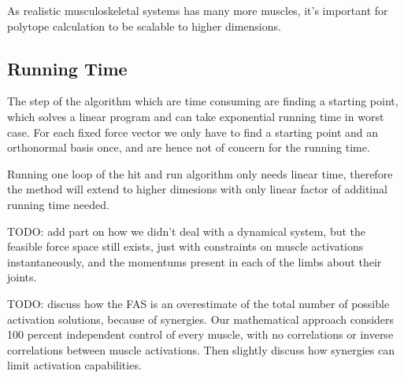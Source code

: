 As realistic musculoskeletal systems has many more muscles, it's important for polytope calculation to be scalable to higher dimensions.

\subsection{Running Time}
The step of the algorithm which are time consuming are finding a starting point, which solves a linear program and can take exponential running time in worst case. For each fixed force vector we only have to find a starting point and an orthonormal basis once, and are hence not of concern for the running time.

Running one loop of the hit and run algorithm only needs linear time, therefore the method will extend to higher dimesions with only linear factor of additinal running time needed.

TODO: add part on how we didn't deal with a dynamical system, but the feasible force space still exists, just with constraints on muscle activations instantaneously, and the momentums present in each of the limbs about their joints.

TODO: discuss how the FAS is an overestimate of the total number of possible activation solutions, because of synergies. Our mathematical approach considers 100 percent independent control of every muscle, with no correlations or inverse correlations between muscle activations. Then slightly discuss how synergies can limit activation capabilities.